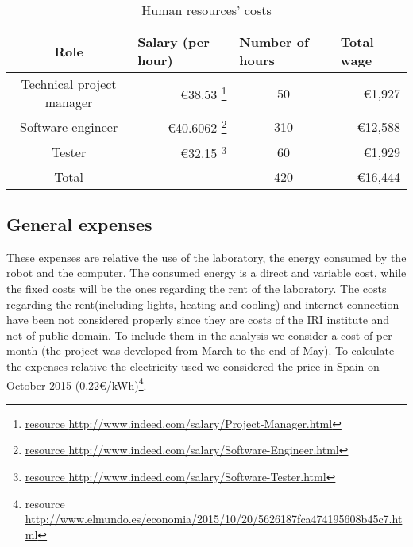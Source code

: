 \begin{savenotes}%
\begin{table}[ht]
  \centering
  \begin{tabular}{|c|r|c|r|}
    \hline
    \textbf{Role}      & \multicolumn{1}{l|}{\textbf{Salary (per hour)}} & \multicolumn{1}{l|}{\textbf{Number of hours}} & \multicolumn{1}{l|}{\textbf{Total wage}} \\ \hline\hline
    Technical project manager  & €38.53 \footnote{\href{http://www.indeed.com/salary/Project-Manager.html}{resource \url{http://www.indeed.com/salary/Project-Manager.html}}}  & 50                                           & €1,927   \\ \hline
    Software engineer & €40.6062                                         \footnote{\href{http://www.indeed.com/salary/Software-Engineer.html}{resource \url{http://www.indeed.com/salary/Software-Engineer.html}}}   & 310 & €12,588
    \\ \hline
    
    Tester             & €32.15 \footnote{\href{http://www.indeed.com/salary/Software-Tester.html}{resource \url{http://www.indeed.com/salary/Software-Tester.html}}}   & 60                                           & €1,929 \\ \hline\hline
    Total              & -                                               & 420                                         & €16,444                               \\ \hline
  \end{tabular}
  \caption{Human resources' costs}
  \label{tab:humanResources}
\end{table}
\end{savenotes}

\subsection*{General expenses}
These expenses are relative the use of the laboratory, the energy consumed by the robot and the computer. The consumed energy is a direct and variable cost, while the fixed costs will be the ones regarding the rent of the laboratory. The costs regarding the rent(including lights, heating and cooling) and internet connection have been not considered properly since they are costs of the IRI institute and not of public domain. To include them in the analysis we consider a cost of  per month (the project was developed from March to the end of May). To calculate the expenses relative the electricity used we considered the price in Spain on October 2015 (0.22€/kWh)\footnote{resource \href{http://www.elmundo.es/economia/2015/10/20/5626187fca474195608b45c7.html}{\url{http://www.elmundo.es/economia/2015/10/20/5626187fca474195608b45c7.html}}}.

